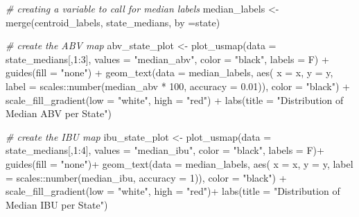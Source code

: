 \documentclass[
]{article}
\newenvironment{Shaded}{\begin{snugshade}}{\end{snugshade}}
\newcommand{\AttributeTok}[1]{\textcolor[rgb]{0.77,0.63,0.00}{#1}}
\newcommand{\CommentTok}[1]{\textcolor[rgb]{0.56,0.35,0.01}{\textit{#1}}}
\newcommand{\DecValTok}[1]{\textcolor[rgb]{0.00,0.00,0.81}{#1}}
\newcommand{\FloatTok}[1]{\textcolor[rgb]{0.00,0.00,0.81}{#1}}
\newcommand{\FunctionTok}[1]{\textcolor[rgb]{0.00,0.00,0.00}{#1}}
\newcommand{\NormalTok}[1]{#1}
\newcommand{\OtherTok}[1]{\textcolor[rgb]{0.56,0.35,0.01}{#1}}
\newcommand{\SpecialCharTok}[1]{\textcolor[rgb]{0.00,0.00,0.00}{#1}}
\newcommand{\StringTok}[1]{\textcolor[rgb]{0.31,0.60,0.02}{#1}}
\begin{document}
\begin{Shaded}
\begin{Highlighting}[]
\CommentTok{\# creating a variable to call for median labels}
\NormalTok{median\_labels }\OtherTok{\textless{}{-}} \FunctionTok{merge}\NormalTok{(centroid\_labels, state\_medians, }\AttributeTok{by =}\StringTok{\textquotesingle{}state\textquotesingle{}}\NormalTok{)}

\CommentTok{\# create the ABV map}
\NormalTok{abv\_state\_plot }\OtherTok{\textless{}{-}} \FunctionTok{plot\_usmap}\NormalTok{(}\AttributeTok{data =}\NormalTok{ state\_medians[,}\DecValTok{1}\SpecialCharTok{:}\DecValTok{3}\NormalTok{],}
                             \AttributeTok{values =} \StringTok{"median\_abv"}\NormalTok{,}
                             \AttributeTok{color =} \StringTok{"black"}\NormalTok{,}
                             \AttributeTok{labels =}\NormalTok{ F) }\SpecialCharTok{+}
  \FunctionTok{guides}\NormalTok{(}\AttributeTok{fill =} \StringTok{"none"}\NormalTok{) }\SpecialCharTok{+}
  \FunctionTok{geom\_text}\NormalTok{(}\AttributeTok{data =}\NormalTok{ median\_labels, }\FunctionTok{aes}\NormalTok{(}
    \AttributeTok{x =}\NormalTok{ x, }\AttributeTok{y =}\NormalTok{ y,}
    \AttributeTok{label =}\NormalTok{ scales}\SpecialCharTok{::}\FunctionTok{number}\NormalTok{(median\_abv }\SpecialCharTok{*} \DecValTok{100}\NormalTok{, }\AttributeTok{accuracy =} \FloatTok{0.01}\NormalTok{)), }\AttributeTok{color =} \StringTok{"black"}\NormalTok{) }\SpecialCharTok{+}
  \FunctionTok{scale\_fill\_gradient}\NormalTok{(}\AttributeTok{low =} \StringTok{"white"}\NormalTok{, }\AttributeTok{high =} \StringTok{"red"}\NormalTok{) }\SpecialCharTok{+}
  \FunctionTok{labs}\NormalTok{(}\AttributeTok{title =} \StringTok{"Distribution of Median ABV per State"}\NormalTok{)}

\CommentTok{\# create the IBU map}
\NormalTok{ibu\_state\_plot }\OtherTok{\textless{}{-}} \FunctionTok{plot\_usmap}\NormalTok{(}\AttributeTok{data =}\NormalTok{ state\_medians[,}\DecValTok{1}\SpecialCharTok{:}\DecValTok{4}\NormalTok{],}
                             \AttributeTok{values =} \StringTok{"median\_ibu"}\NormalTok{,}
                             \AttributeTok{color =} \StringTok{"black"}\NormalTok{,}
                             \AttributeTok{labels =}\NormalTok{ F)}\SpecialCharTok{+}
  \FunctionTok{guides}\NormalTok{(}\AttributeTok{fill =} \StringTok{"none"}\NormalTok{)}\SpecialCharTok{+}
  \FunctionTok{geom\_text}\NormalTok{(}\AttributeTok{data =}\NormalTok{ median\_labels, }\FunctionTok{aes}\NormalTok{(}
    \AttributeTok{x =}\NormalTok{ x, }\AttributeTok{y =}\NormalTok{ y,}
    \AttributeTok{label =}\NormalTok{ scales}\SpecialCharTok{::}\FunctionTok{number}\NormalTok{(median\_ibu, }\AttributeTok{accuracy =} \DecValTok{1}\NormalTok{)), }\AttributeTok{color =} \StringTok{"black"}\NormalTok{) }\SpecialCharTok{+}
  \FunctionTok{scale\_fill\_gradient}\NormalTok{(}\AttributeTok{low =} \StringTok{"white"}\NormalTok{, }\AttributeTok{high =} \StringTok{"red"}\NormalTok{)}\SpecialCharTok{+}
  \FunctionTok{labs}\NormalTok{(}\AttributeTok{title =} \StringTok{"Distribution of Median IBU per State"}\NormalTok{)}


\end{Highlighting}
\end{Shaded}
\end{document}
